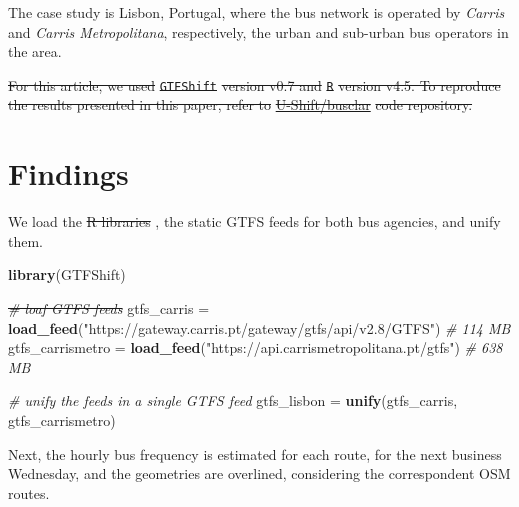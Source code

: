 \documentclass[
]{article}
\newenvironment{Shaded}{\begin{snugshade}}{\end{snugshade}}
\newcommand{\CommentTok}[1]{\textcolor[rgb]{0.56,0.35,0.01}{\textit{#1}}}
\newcommand{\FunctionTok}[1]{\textcolor[rgb]{0.13,0.29,0.53}{\textbf{#1}}}
\newcommand{\NormalTok}[1]{#1}
\newcommand{\OtherTok}[1]{\textcolor[rgb]{0.56,0.35,0.01}{#1}}
\newcommand{\StringTok}[1]{\textcolor[rgb]{0.31,0.60,0.02}{#1}}
\providecommand{\DIFadd}[1]{{\protect\color{green}{#1}}} %
\providecommand{\DIFdel}[1]{{\protect\color{red}\sout{#1}}}                      %
\providecommand{\DIFaddbegin}{} %
\providecommand{\DIFaddend}{} %
\providecommand{\DIFdelbegin}{} %
\providecommand{\DIFdelend}{} %
\newcommand{\DIFscaledelfig}{0.5}
\newlength{\DIFdelgraphicswidth} %
\newlength{\DIFdelgraphicsheight} %
\newcommand{\DIFaddincludegraphics}[2][]{{\color{blue}\fbox{\DIFOincludegraphics[#1]{#2}}}} %
\newcommand{\DIFdelincludegraphics}[2][]{%
\sbox{\DIFdelgraphicsbox}{\DIFOincludegraphics[#1]{#2}}%
\settoboxwidth{\DIFdelgraphicswidth}{\DIFdelgraphicsbox} %
\settoboxtotalheight{\DIFdelgraphicsheight}{\DIFdelgraphicsbox} %
\scalebox{\DIFscaledelfig}{%
\parbox[b]{\DIFdelgraphicswidth}{\usebox{\DIFdelgraphicsbox}\\[-\baselineskip] \rule{\DIFdelgraphicswidth}{0em}}\llap{\resizebox{\DIFdelgraphicswidth}{\DIFdelgraphicsheight}{%
\setlength{\unitlength}{\DIFdelgraphicswidth}%
\begin{picture}(1,1)%
\thicklines\linethickness{2pt} %
{\color[rgb]{1,0,0}\put(0,0){\framebox(1,1){}}}%
{\color[rgb]{1,0,0}\put(0,0){\line( 1,1){1}}}%
{\color[rgb]{1,0,0}\put(0,1){\line(1,-1){1}}}%
\end{picture}%
}\hspace*{3pt}}} %
} %
\DeclareRobustCommand{\DIFaddbegin}{\DIFOaddbegin \let\includegraphics\DIFaddincludegraphics} %
\DeclareRobustCommand{\DIFaddend}{\DIFOaddend \let\includegraphics\DIFOincludegraphics} %
\DeclareRobustCommand{\DIFdelbegin}{\DIFOdelbegin \let\includegraphics\DIFdelincludegraphics} %
\DeclareRobustCommand{\DIFdelend}{\DIFOaddend \let\includegraphics\DIFOincludegraphics} %
\begin{document}
The case study is Lisbon, Portugal, where the bus network is operated by \emph{Carris} and \emph{Carris Metropolitana}, respectively, the urban and sub-urban bus operators in the area.

\DIFdelbegin \DIFdel{For this article, we used }\texttt{\DIFdel{GTFShift}} %
\DIFdel{version v0.7 and }\texttt{\DIFdel{R}} %
\DIFdel{version v4.5.
To reproduce the results presented in this paper, refer to }\href{https://github.com/U-Shift/busclar}{\DIFdel{U-Shift/busclar}} %
\DIFdel{code repository.
}%

\DIFdelend \section{Findings}\label{findings}

We load the \DIFdelbegin \DIFdel{R libraries}\DIFdelend \DIFaddbegin \href{https://u-shift.github.io/GTFShift/}{\texttt{\DIFadd{GTFShift}}} \DIFadd{R library}\DIFaddend , the static GTFS feeds for both bus agencies, and unify them.

\begin{Shaded}
\begin{Highlighting}[]
\FunctionTok{library}\NormalTok{(GTFShift)}

\DIFdelbegin \DIFdel{\CommentTok{\# loaf GTFS feeds}
}\DIFdelend \DIFaddbegin \DIFadd{\CommentTok{\# load GTFS feeds}
}\DIFaddend \NormalTok{gtfs\_carris }\OtherTok{=} \FunctionTok{load\_feed}\NormalTok{(}\StringTok{"https://gateway.carris.pt/gateway/gtfs/api/v2.8/GTFS"}\NormalTok{) }\CommentTok{\# 114 MB}
\NormalTok{gtfs\_carrismetro }\OtherTok{=} \FunctionTok{load\_feed}\NormalTok{(}\StringTok{"https://api.carrismetropolitana.pt/gtfs"}\NormalTok{) }\CommentTok{\# 638 MB}
\end{Highlighting}
\end{Shaded}

\begin{Shaded}
\begin{Highlighting}[]
\CommentTok{\# unify the feeds in a single GTFS feed}
\NormalTok{gtfs\_lisbon }\OtherTok{=} \FunctionTok{unify}\NormalTok{(gtfs\_carris, gtfs\_carrismetro)}
\end{Highlighting}
\end{Shaded}

Next, the hourly bus frequency is estimated for each route, for the next business Wednesday, and the geometries are overlined, considering the correspondent OSM routes.
\end{document}
